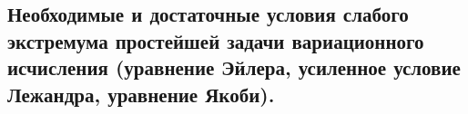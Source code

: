 \subsection{Необходимые и достаточные условия слабого экстремума простейшей задачи вариационного исчисления (уравнение Эйлера, усиленное условие Лежандра, уравнение Якоби).}